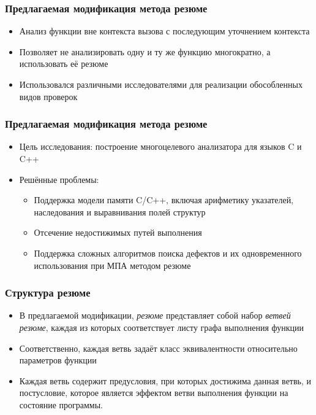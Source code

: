 \documentclass[14pt]{beamer}
\begin{document}
\begin{frame}[allowframebreaks]
\frametitle{Предлагаемая модификация метода резюме}
\begin{itemize}
  \item Анализ функции вне контекста вызова с последующим уточнением контекста
  \item Позволяет не анализировать одну и ту же функцию многократно, а использовать её резюме
  \item Использовался различными исследователями для реализации обособленных видов проверок
\end{itemize}
\end{frame}

\begin{frame}[allowframebreaks]
\frametitle{Предлагаемая модификация метода резюме}
\begin{itemize}
  \item Цель исследования: построение многоцелевого анализатора для языков C и C++
  \item Решённые проблемы:
  \begin{itemize}
    \item Поддержка модели памяти C/C++, включая арифметику указателей, наследования и выравнивания полей структур
    \item Отсечение недостижимых путей выполнения
    \item Поддержка сложных алгоритмов поиска дефектов и их одновременного использования при МПА методом резюме
  \end{itemize}
\end{itemize}
\end{frame}

\begin{frame}
\frametitle{Структура резюме}
\begin{itemize}
  \item В предлагаемой модификации, \textit{резюме} представляет собой набор \textit{ветвей резюме}, каждая из которых соответствует листу графа выполнения функции
  \item Соответственно, каждая ветвь задаёт класс эквивалентности относительно параметров функции
  \item Каждая ветвь содержит предусловия, при которых достижима данная ветвь, и постусловие, которое является эффектом ветви выполнения функции на состояние программы.
\end{itemize}
\end{frame}
\end{document}
